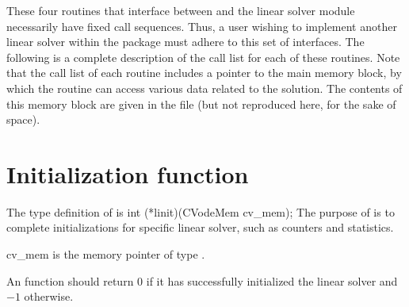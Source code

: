 These four routines that interface between {\cvode} and the linear solver module
necessarily have fixed call sequences.  Thus, a user wishing to implement another 
linear solver within the {\cvode} package must adhere to this set of interfaces.
The following is a complete description of the call list for each of
these routines.  Note that the call list of each routine includes a
pointer to the main {\cvode} memory block, by which the routine can access
various data related to the {\cvode} solution.  The contents of this memory
block are given in the file  (but not reproduced here, for
the sake of space).


\section{Initialization function}
The type definition of  is
{
  int (*linit)(CVodeMem cv\_mem);
}
{
  The purpose of  is to complete initializations for      
  specific linear solver, such as counters and statistics.        
}
{
  \begin{args}[cv\_mem]
  \item[cv\_mem]
    is the {\cvode} memory pointer of type .
  \end{args}
}
{
  An  function should return $0$ if it 
  has successfully initialized the {\cvode} linear solver and 
  $-1$ otherwise. 
}
{}


